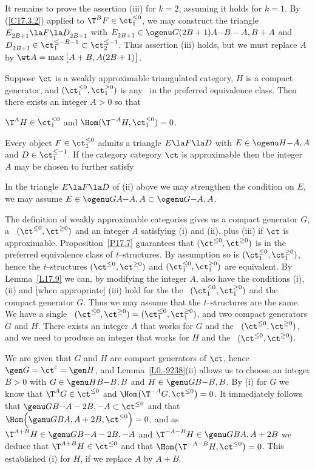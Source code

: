 \documentclass[11pt]{amsart}
\begin{document}
It remains to prove the assertion (iii) for $k=2$, assuming it holds
for $k=1$. By (\ref{C17.3.2}) applied to $\T^BF\in\ct_1^{\leq 0}$, we
may construct the triangle
$E_{2B+1}^{}\la F\la D_{2B+1}^{}$ with
$E_{2B+1}^{}\in\ogenu G{(2B+1)A}{-B-A,B+A}$ and
$D_{2B+1}^{}\in\ct_1^{\leq-B-1}\subset\ct_2^{\leq-1}$.
Thus assertion (iii) holds, but we must replace $A$ by
$\wt A=\max\big[A+B,A(2B+1)\big]$.
\eprf

Suppose $\ct$ is a weakly approximable triangulated category, $H$ is a
compact generator, and $(\ct_1^{\leq0},\ct_1^{\geq0})$ is any \tstr\ in
the preferred equivalence class. Then there exists an integer
$A>0$ so that
\be
\item
$\T^AH\in\ct_1^{\leq0}$ and $\Hom(\T^{-A}H,\ct_1^{\leq0})=0$.
\item
Every object $F\in\ct_1^{\leq 0}$ admits a triangle
$E\la F\la D$ with $E\in\ogenu H{}{-A,A}$ and
$D\in\ct_1^{\leq-1}$.
\setcounter{enumiv}{\value{enumi}}
\ee
If the category category $\ct$ is approximable then the integer $A$
may be chosen to further satisfy
\be
\setcounter{enumi}{\value{enumiv}}
\item
In the triangle 
$E\la F\la D$ of (ii) above we may  
strengthen the condition on $E$, we may assume
$E\in\ogenu GA{-A,A}\subset\ogenu G{}{-A,A}$.
\setcounter{enumiv}{\value{enumi}}
\ee
\epro

\prf
The definition of weakly approximable categories gives us
a compact generator $G$, a \tstr\ $(\ct^{\leq0},\ct^{\geq0})$
and an integer $A$
satisfying (i) and (ii), plus (iii) if $\ct$ is
approximable. Proposition~\ref{P17.7} guarantees
that $(\ct^{\leq0},\ct^{\geq0})$ is in the preferred
equivalence class of
{\it t}--structures. By assumption so is
$(\ct_1^{\leq0},\ct_1^{\geq0})$, hence
the {\it t}--structures $(\ct^{\leq0},\ct^{\geq0})$
and
$(\ct_1^{\leq0},\ct_1^{\geq0})$
are equivalent. By Lemma~\ref{L17.9} we can, by
modifying the integer $A$, also have the conditions
(i), (ii) and [when appropriate] (iii) hold for
the the \tstr\ $(\ct_1^{\leq0},\ct_1^{\geq0})$ and the
compact generator $G$. Thus
we may assume that the {\it t}--structures are the
same. We have a single \tstr\
$(\ct^{\leq0},\ct^{\geq0})=(\ct_1^{\leq0},\ct_1^{\geq0})$,
and two compact generators $G$ and $H$. There exists an integer
$A$ that works for $G$ and the \tstr\  $(\ct^{\leq0},\ct^{\geq0})$,
and we need to produce an integer that works for
$H$ and the \tstr\ $(\ct^{\leq0},\ct^{\geq0})$.

We are given that $G$ and $H$ are compact generators of $\ct$,
hence
$\gen G{}=
\ct^c =\gen H{}$,
and Lemma~\ref{L0.-9238}(ii) allows us to choose an integer
$B>0$ with
$G\in \genu HB{-B,B}$ and 
$H\in \genu GB{-B,B}$.
By (i) for $G$ we know that $\T^AG\in\ct^{\leq0}$ and
$\Hom\big(\T^{-A}G,\ct^{\leq0}\big)=0$. It immediately follows
that $\genu GB{-A-2B,-A}\subset\ct^{\leq0}$ and
that $\Hom\Big(\genu GB{A,A+2B},\ct^{\leq0}\Big)=0$,
and as $\T^{A+B}H\in\genu GB{-A-2B,-A}$ and
$\T^{-A-B}H\in\genu GB{A,A+2B}$ we deduce
that $\T^{A+B}H\in\ct^{\leq0}$ and that
$\Hom\big(\T^{-A-B}H,\ct^{\leq0}\big)=0$. This established (i) for $H$,
if we replace $A$ by $A+B$.
\end{document}
